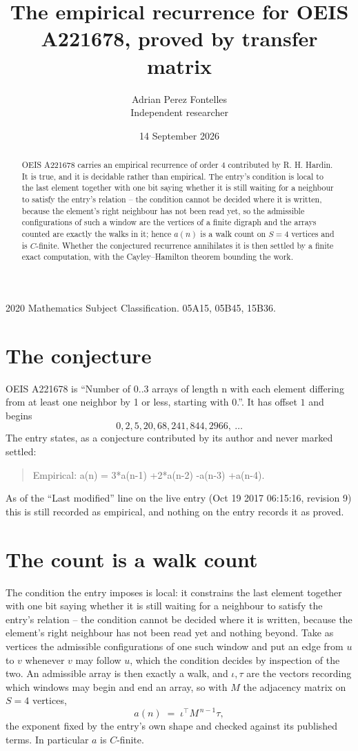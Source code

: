 \documentclass[11pt,a4paper]{article}
\title{The empirical recurrence for OEIS A221678, proved by transfer matrix}
\author{Adrian Perez Fontelles\\ \small Independent researcher}
\date{14 September 2026}
\theoremstyle{plain}
\theoremstyle{definition}
\begin{document}
\maketitle

\begin{abstract}
OEIS A221678 carries an empirical recurrence of order $4$ contributed by R. H. Hardin. It is
true, and it is decidable rather than empirical. The entry's condition is local to the last element together with one bit saying whether it is still waiting for a neighbour to satisfy the entry's relation -- the condition cannot be decided where it is written, because the element's right neighbour has not been read yet, so
the admissible configurations of such a window are the vertices of a finite digraph and the
arrays counted are exactly the walks in it; hence $a(n)$ is a walk count on $S=4$ vertices
and is $C$-finite. Whether the conjectured recurrence annihilates it is then settled by a
finite exact computation, with the Cayley--Hamilton theorem bounding the work.
\end{abstract}

\noindent\small 2020 Mathematics Subject Classification. 05A15, 05B45, 15B36.\normalsize

\section{The conjecture}

OEIS A221678 is ``Number of 0..3 arrays of length n with each element differing from at least one neighbor by 1 or less, starting with 0.''. It has offset $1$ and begins
\[
0, 2, 5, 20, 68, 241, 844, 2966,\ \dots
\]
The entry states, as a conjecture contributed by its author and never marked settled:
\begin{quote}
Empirical: a(n) = 3*a(n-1) +2*a(n-2) -a(n-3) +a(n-4).
\end{quote}
As of the ``Last modified'' line on the live entry (Oct 19 2017 06:15:16, revision 9) this is still
recorded as empirical, and nothing on the entry records it as proved.

\section{The count is a walk count}

The condition the entry imposes is local: it constrains the last element together with one bit saying whether it is still waiting for a neighbour to satisfy the entry's relation -- the condition cannot be decided where it is written, because the element's right neighbour has not been read yet and nothing beyond. Take as vertices the admissible configurations of one such window and put an edge from $u$ to $v$ whenever $v$ may follow $u$, which the condition decides by inspection of the two.
An admissible array is then exactly a walk, and $\iota,\tau$ are the vectors recording which windows may begin and end an array, so with $M$ the adjacency matrix on $S=4$ vertices,
\[
a(n)\;=\;\iota^{\!\top}M^{\,n-1}\tau ,
\]
the exponent fixed by the entry's own shape and checked against its published terms. In
particular $a$ is $C$-finite.
\end{document}
